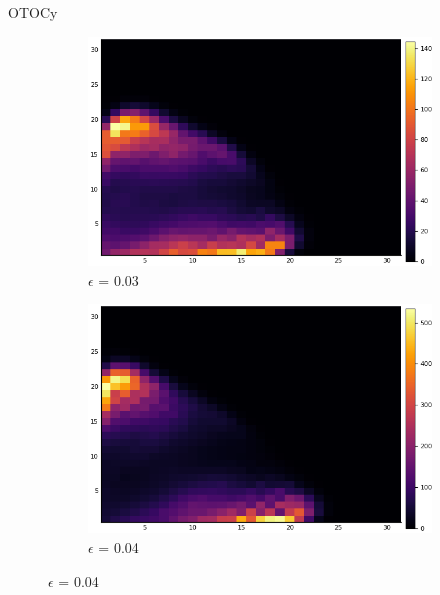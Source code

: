 \documentclass{article}
\begin{document}
\begin{section}{OTOCy}
\begin{figure}[H]
                              \begin{subfigure}{.33\textwidth}
                                \centering
                                \includegraphics[width=1.0\linewidth]{4.png}
                              \caption{$\epsilon$ = 0.03}

                               
                              \end{subfigure}%
                              \begin{subfigure}{.33\textwidth}
                                \centering
                                \includegraphics[width=1.0\linewidth]{5.png}
                              \caption{$\epsilon$ = 0.04}


\end{subfigure}
\end{figure}
\end{section}
\end{document}
